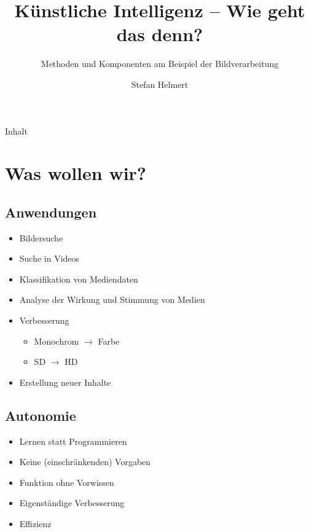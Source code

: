 \documentclass{beamer}
\title{Künstliche Intelligenz -- Wie geht das denn?}
\subtitle{Methoden und Komponenten am Beispiel der Bildverarbeitung}
\author{Stefan Helmert}
\institute[TU Chemnitz] %
{
  TU Chemnitz -- Professorship of Computer Graphics and Visualization
  
}
\institute[Chaostreff Chemnitz] %
{
	Chaostreff Chemnitz e.V.
	
}
\begin{document}
\begin{frame}
  \titlepage
\end{frame}

\begin{frame}{Inhalt}
  \tableofcontents
\end{frame}


\section{Was wollen wir?}
\subsection{Anwendungen}
\begin{frame}{\insertsection}{\insertsubsection}
\begin{itemize}
	\item Bildersuche
	\item Suche in Videos
	\item Klassifikation von Mediendaten
	\item Analyse der Wirkung und Stimmung von Medien
	\item Verbesserung
	\begin{itemize}
		\item Monochrom $\rightarrow$ Farbe
		\item SD $\rightarrow$ HD
	\end{itemize}
	\item Erstellung neuer Inhalte
\end{itemize}
\end{frame}

\subsection{Autonomie}
\begin{frame}{\insertsection}{\insertsubsection}
	\begin{itemize}
		\item Lernen statt Programmieren
		\item Keine (einschränkenden) Vorgaben
		\item Funktion ohne Vorwissen
		\item Eigenständige Verbesserung
		\item Effizienz
	\end{itemize}
\end{frame}
\end{document}
